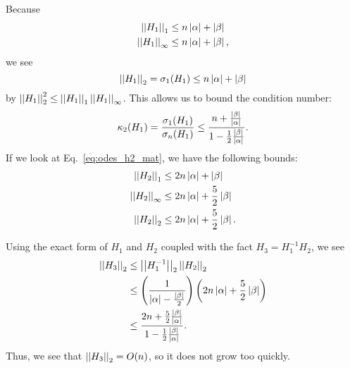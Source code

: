 \noindent
Because
%
\begin{align}
    \left| \left| H_{1} \right| \right|_{1} &\le n\left| \alpha \right| + \left| \beta \right| \nonumber\\
    \left| \left| H_{1} \right| \right|_{\infty} &\le n\left| \alpha \right| + \left| \beta \right|,
\end{align}
%
we see
%
\begin{equation}
    \left| \left| H_{1} \right| \right|_{2} = \sigma_{1}(H_{1}) \le n\left| \alpha \right| + \left| \beta \right|
\end{equation}
%
by $\left| \left| H_{1} \right| \right|_{2}^{2} \le \left| \left| H_{1} \right| \right|_{1}\left| \left| H_{1} \right| \right|_{\infty}$.
This allows us to bound the condition number:
%
\begin{equation}
    \kappa_{2}(H_{1}) = \frac{\sigma_{1}(H_{1})}{\sigma_{n}(H_{1})}
            \le \frac{n + \frac{\left| \beta \right|}{\left| \alpha \right|}}{
                      1 - \frac{1}{2}\frac{\left| \beta \right|}{\left| \alpha \right|}}.
\end{equation}
%
If we look at Eq.~\eqref{eq:odes_h2_mat}, we have the following bounds:
%
\begin{align}
    \left| \left| H_{2} \right| \right|_{1} &\le 2n\left| \alpha \right| + \left| \beta \right|
        \nonumber\\
    \left| \left| H_{2} \right| \right|_{\infty} &\le 2n\left| \alpha \right| + \frac{5}{2}\left| \beta \right|
        \nonumber\\
    \left| \left| H_{2} \right| \right|_{2} &\le 2n\left| \alpha \right| + \frac{5}{2}\left| \beta \right|.
\end{align}

Using the exact form of $H_{1}$ and $H_{2}$ coupled with the fact
$H_{3} = H_{1}^{-1}H_{2}$, we see
%
\begin{align}
    \left| \left| H_{3} \right| \right|_{2} &\le \left| \left| H_{1}^{-1} \right| \right|_{2}\left| \left| H_{2} \right| \right|_{2}
        \nonumber\\
    &\le \left( \frac{1}{\left| \alpha \right| - \frac{\left| \beta \right|}{2}} \right)
            \left( 2n\left| \alpha \right| + \frac{5}{2}\left| \beta \right| \right) \nonumber\\
    &\le \frac{2n + \frac{5}{2}\frac{\left| \beta \right|}{\left| \alpha \right|}}{
        1-\frac{1}{2}\frac{\left| \beta \right|}{\left| \alpha \right|}}.
\end{align}
%
Thus, we see that $\left| \left| H_{3} \right| \right|_{2} = O(n)$, so it does not
grow too quickly.

